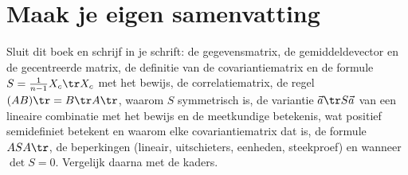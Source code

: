 
\begin{oefeningen}






\end{oefeningen}


\ifzelfstudie
\section*{Maak je eigen samenvatting}
Sluit dit boek en schrijf in je schrift: de gegevensmatrix, de gemiddeldevector en de gecentreerde matrix, de definitie van de covariantiematrix en de formule $S = \frac{1}{n-1}X_c\tr X_c$ met het bewijs, de correlatiematrix, de regel $(AB)\tr = B\tr A\tr$, waarom $S$ symmetrisch is, de variantie $\vec a\tr S\vec a$ van een lineaire combinatie met het bewijs en de meetkundige betekenis, wat positief semidefiniet betekent en waarom elke covariantiematrix dat is, de formule $ASA\tr$, de beperkingen (lineair, uitschieters, eenheden, steekproef) en wanneer $\det S = 0$. Vergelijk daarna met de kaders.
\fi
